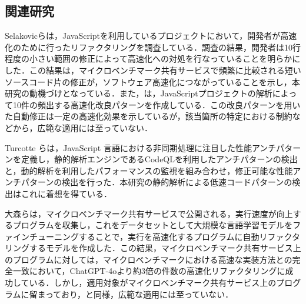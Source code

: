 \documentclass[submit,techrep,noauthor]{ipsj}
\newcommand{\memo}[1]{\colorbox{magenta!30}{{\bf MEMO}:}{\color{red!50} {\textbf{[#1]}}}}
\begin{document}


\subsection{関連研究}

Selakovicら\cite{jsRefac}は，JavaScriptを利用しているプロジェクトにおいて，開発者が高速化のために行ったリファクタリングを調査している．調査の結果，開発者は10行程度の小さい範囲の修正によって高速化への対処を行なっていることを明らかにした．この結果は，マイクロベンチマーク共有サービスで頻繁に比較される短いソースコード片の修正が，ソフトウェア高速化につながっていることを示し，本研究の動機づけとなっている．また，\cite{jsRefac}は，JavaScriptプロジェクトの解析によって10件の頻出する高速化改良パターンを作成している．この改良パターンを用いた自動修正は一定の高速化効果を示しているが，該当箇所の特定における制約などから，広範な適用には至っていない．

Turcotte ら\cite{DrAsync}は，JavaScript 言語における非同期処理に注目した性能アンチパターンを定義し，静的解析エンジンであるCodeQL\cite{ql}を利用したアンチパターンの検出と，動的解析を利用したパフォーマンスの監視を組み合わせ，修正可能な性能アンチパターンの検出を行った．本研究の静的解析による低速コードパターンの検出はこれに着想を得ている．

大森ら\cite{omori}は，マイクロベンチマーク共有サービスで公開される，実行速度が向上するプログラムを収集し，これをデータセットとして大規模な言語学習モデルをファインチューニングすることで，実行を高速化するプログラムに自動リファクタリングするモデルを作成した．この結果，マイクロベンチマーク共有サービス上のプログラムに対しては，マイクロベンチマークにおける高速な実装方法との完全一致において，ChatGPT-4oより約3倍の件数の高速化リファクタリングに成功している．しかし，適用対象がマイクロベンチマーク共有サービス上のプログラムに留まっており，\cite{jsRefac}と同様，広範な適用には至っていない．

\end{document}
